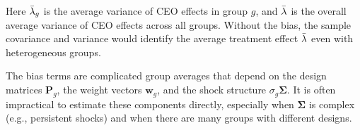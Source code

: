 \documentclass[11pt,a4paper]{article}
\begin{document}
Here $\Bar\lambda_g$ is the average variance of CEO effects in group $g$, and $\Bar\lambda$ is the overall average variance of CEO effects across all groups. Without the bias, the sample covariance and variance would identify the average treatment effect $\Bar\lambda$ even with heterogeneous groups.

The bias terms are complicated group averages that depend on the design matrices $\mathbf P_g$, the weight vectors $\mathbf w_g$, and the shock structure $\sigma_g\mathbf\Sigma$. It is often impractical to estimate these components directly, especially when $\mathbf\Sigma$ is complex (e.g., persistent shocks) and when there are many groups with different designs.




%
\end{document}
